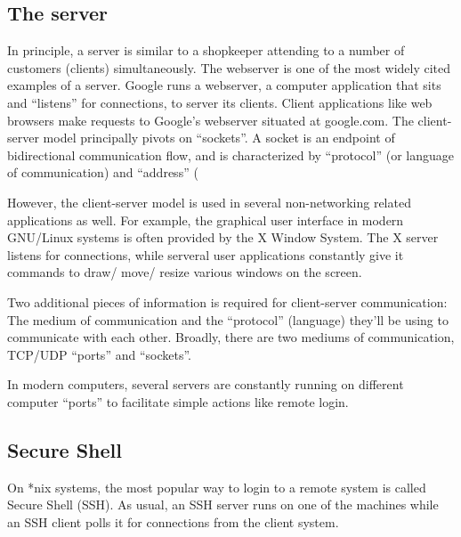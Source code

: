 \subsection{The server}
In principle, a server is similar to a shopkeeper attending to a number of customers (clients) simultaneously. The webserver is one of the most widely cited examples of a server. Google runs a webserver, a computer application that sits and ``listens'' for connections, to server its clients. Client applications like web browsers make requests to Google's webserver situated at google.com. The client-server model principally pivots on ``sockets''. A socket is an endpoint of bidirectional communication flow, and is characterized by ``protocol'' (or language of communication) and ``address'' (

However, the client-server model is used in several non-networking related applications as well. For example, the graphical user interface in modern GNU/Linux systems is often provided by the X Window System. The X server listens for connections, while serveral user applications constantly give it commands to draw/ move/ resize various windows on the screen.

Two additional pieces of information is required for client-server communication: The medium of communication and the ``protocol'' (language) they'll be using to communicate with each other. Broadly, there are two mediums of communication, TCP/UDP ``ports'' and ``sockets''. 

In modern computers, several servers are constantly running on different computer ``ports'' to facilitate simple actions like remote login.

\subsection{Secure Shell}
On *nix systems, the most popular way to login to a remote system is called Secure Shell (SSH). As usual, an SSH server runs on one of the machines while an SSH client polls it for connections from the client system.
